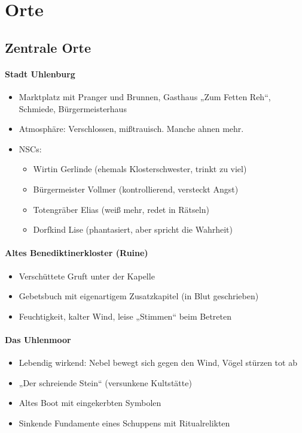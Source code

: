 \section{Orte}
\subsection{Zentrale Orte}
    \paragraph{Stadt Uhlenburg}
	\begin{itemize}
    \item Marktplatz mit Pranger und Brunnen, Gasthaus „Zum Fetten Reh“, Schmiede, Bürgermeisterhaus
     \item Atmosphäre: Verschlossen, mißtrauisch. Manche ahnen mehr.
     \item  NSCs:
		\begin{itemize}
         \item Wirtin Gerlinde (ehemals Klosterschwester, trinkt zu viel)
         \item Bürgermeister Vollmer (kontrollierend, versteckt Angst)
         \item Totengräber Elias (weiß mehr, redet in Rätseln)
         \item Dorfkind Lise (phantasiert, aber spricht die Wahrheit)
        \end{itemize}
    \end{itemize}
    \paragraph{Altes Benediktinerkloster (Ruine)}
	\begin{itemize}
     \item Verschüttete Gruft unter der Kapelle
     \item Gebetsbuch mit eigenartigem Zusatzkapitel (in Blut geschrieben)
     \item Feuchtigkeit, kalter Wind, leise „Stimmen“ beim Betreten
    \end{itemize}
    \paragraph{Das Uhlenmoor}
	\begin{itemize}
     \item Lebendig wirkend: Nebel bewegt sich gegen den Wind, Vögel stürzen tot ab
     \item „Der schreiende Stein“ (versunkene Kultstätte)
     \item Altes Boot mit eingekerbten Symbolen
     \item Sinkende Fundamente eines Schuppens mit Ritualrelikten
    \end{itemize}

